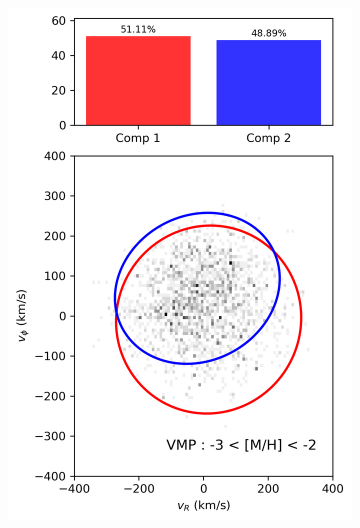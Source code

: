 \documentclass[a4paper,12pt]{article}
\begin{document}
\begin{figure}[h]
    \centering
    \begin{subfigure}[t]{0.24\textwidth}
        \centering
        \includegraphics[width=\linewidth]{../figures/gmm_VMP.png}
    \end{subfigure}
    \hfill
    \begin{subfigure}[t]{0.24\textwidth}
        \centering

\end{subfigure}
\end{figure}
\end{document}
